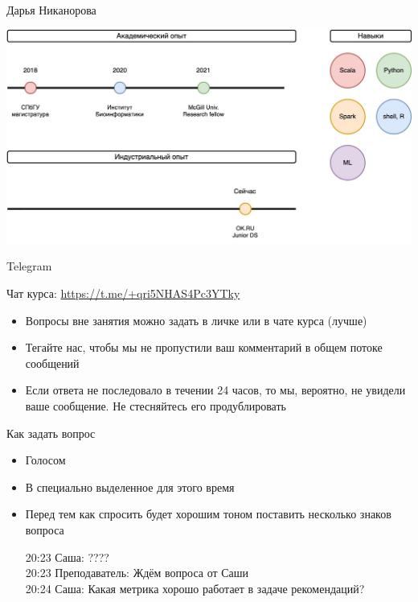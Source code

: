 \documentclass[11pt,aspectratio=169,handout=true]{beamer}
\begin{document}
\begin{frame}{Дарья Никанорова}

\begin{center}
\includegraphics[scale=0.23]{images/about-me-dasha.jpg}
\end{center}

\end{frame}

\begin{frame}{Telegram}

Чат курса: \url{https://t.me/+qri5NHAS4Pc3YTky}

\vfill

\begin{itemize}
\item Вопросы вне занятия можно задать в личке или в чате курса (лучше)
\item Тегайте нас, чтобы мы не пропустили ваш комментарий в общем потоке сообщений
\item Если ответа не последовало в течении 24 часов, то мы, вероятно, не увидели ваше сообщение. Не стесняйтесь его продублировать
\end{itemize}

\end{frame}

\begin{frame}{Как задать вопрос}

\begin{itemize}
\item Голосом
\item В специально выделенное для этого время
\item Перед тем как спросить будет хорошим тоном поставить несколько знаков вопроса
\begin{tcolorbox}[colback=gray!5,colframe=gray!80,title=]
20:23 Саша: ???? \\
20:23 Преподаватель: Ждём вопроса от Саши \\
20:24 Саша: Какая метрика хорошо работает в задаче рекомендаций?
\end{tcolorbox}
\end{itemize}

\end{frame}
\end{document}
